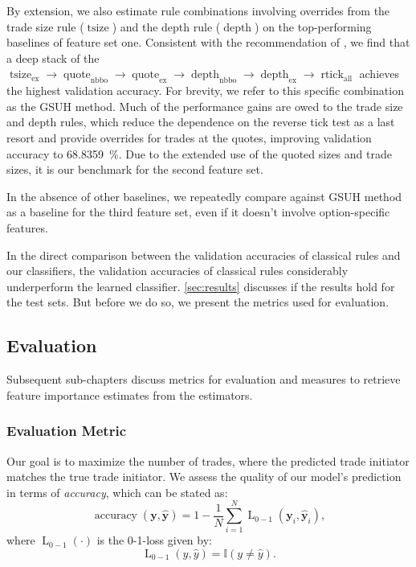 By extension, we also estimate rule combinations involving overrides from the trade size rule ($\operatorname{tsize}$) and the depth rule ($\operatorname{depth}$) on the top-performing baselines of feature set one. Consistent with the recommendation of \textcite[][14]{grauerOptionTradeClassification2022}, we find that a deep stack of the $\operatorname{tsize}_{\mathrm{ex}} \to \operatorname{quote}_{\mathrm{nbbo}} \to \operatorname{quote}_{\mathrm{ex}} \to \operatorname{depth}_{\mathrm{nbbo}} \to \operatorname{depth}_{\mathrm{ex}} \to \operatorname{rtick}_{\mathrm{all}}$ achieves the highest validation accuracy. For brevity, we refer to this specific combination as the \gls{GSUH} method. Much of the performance gains are owed to the trade size and depth rules, which reduce the dependence on the reverse tick test as a last resort and provide overrides for trades at the quotes, improving validation accuracy to \SI{68.8359}{\percent}. Due to the extended use of the quoted sizes and trade sizes, it is our benchmark for the second feature set.

In the absence of other baselines, we repeatedly compare against \gls{GSUH} method as a baseline for the third feature set, even if it doesn't involve option-specific features.

In the direct comparison between the validation accuracies of classical rules and our classifiers, the validation accuracies of classical rules considerably underperform the learned classifier. \cref{sec:results} discusses if the results hold for the test sets. But before we do so, we present the metrics used
for evaluation.

\subsection{Evaluation}\label{sec:evaluation}

Subsequent sub-chapters discuss metrics for evaluation and measures to retrieve feature importance estimates from the estimators.

\subsubsection{Evaluation Metric}\label{sec:evaluation-metric}

Our goal is to maximize the number of trades, where the predicted trade initiator matches the true trade initiator. We assess the quality of our model’s prediction in terms of \emph{accuracy}, which can be stated as:
\begin{equation}
    \operatorname{accuracy}(\mathbf{y}, \widehat{\mathbf{y}}) = 1 - \frac{1}{N}\sum_{i=1}^{N} \operatorname{L}_{\mathrm{0-1}}(\mathbf{y}_i, \widehat{\mathbf{y}}_i),
\end{equation}
where $\operatorname{L}_{\mathrm{0-1}}(\cdot)$ is the 0-1-loss given by:
\begin{equation}
    \operatorname{L}_{\mathrm{0-1}}(y, \hat{y}) = \mathbb{I}\left(y\neq \hat{y}\right).
\end{equation}

